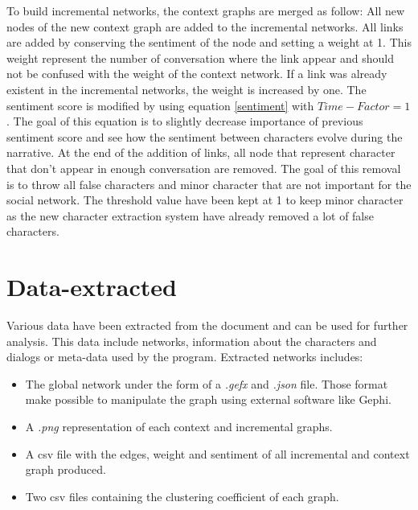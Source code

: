 \documentclass[a4paper, 12pt]{report}
\begin{document}
To build incremental networks, the context graphs are merged as follow: All new nodes of the new context graph are added to the incremental networks. 
All links are added by conserving the sentiment of the node and setting a weight at 1. This weight represent the number of conversation where the link appear and should not be confused with the weight of the context network. If a link was already existent in the incremental networks, the weight is increased by one. 
The sentiment score is modified by using equation \ref{sentiment} with $Time-Factor = 1$
. The goal of this equation is to slightly decrease importance of previous sentiment score and see how the sentiment between characters evolve during the narrative. 
At the end of the addition of links, all node that represent character that don't appear in enough conversation are removed. The goal of this removal is to throw all false characters and minor character that are not important for the social network. The threshold value have been kept at 1 to keep minor character as the new character extraction system have already removed a lot of false characters.




\newpage
\section{Data-extracted}
Various data have been extracted from the document and can be used for further analysis. This data include networks, information about the characters and dialogs or meta-data used by the program.
Extracted networks includes:
\begin{itemize}
\item The global network under the form of a \textit{.gefx} and \textit{.json} file. Those format make possible to manipulate the graph using external software like Gephi.
\item A \textit{.png} representation of each context and incremental graphs.
\item A csv file with the edges, weight and sentiment of all incremental and context graph produced.
\item Two csv files containing the clustering coefficient of each graph.
\end{itemize}
\end{document}
